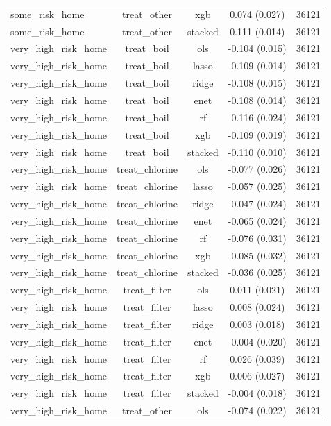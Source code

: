 \begin{table}[htbp]
\begin{tabular}{lcccc}
some_risk_home & treat_other & xgb & 0.074 (0.027) & 36121 \\
some_risk_home & treat_other & stacked & 0.111 (0.014) & 36121 \\
very_high_risk_home & treat_boil & ols & -0.104 (0.015) & 36121 \\
very_high_risk_home & treat_boil & lasso & -0.109 (0.014) & 36121 \\
very_high_risk_home & treat_boil & ridge & -0.108 (0.015) & 36121 \\
very_high_risk_home & treat_boil & enet & -0.108 (0.014) & 36121 \\
very_high_risk_home & treat_boil & rf & -0.116 (0.024) & 36121 \\
very_high_risk_home & treat_boil & xgb & -0.109 (0.019) & 36121 \\
very_high_risk_home & treat_boil & stacked & -0.110 (0.010) & 36121 \\
very_high_risk_home & treat_chlorine & ols & -0.077 (0.026) & 36121 \\
very_high_risk_home & treat_chlorine & lasso & -0.057 (0.025) & 36121 \\
very_high_risk_home & treat_chlorine & ridge & -0.047 (0.024) & 36121 \\
very_high_risk_home & treat_chlorine & enet & -0.065 (0.024) & 36121 \\
very_high_risk_home & treat_chlorine & rf & -0.076 (0.031) & 36121 \\
very_high_risk_home & treat_chlorine & xgb & -0.085 (0.032) & 36121 \\
very_high_risk_home & treat_chlorine & stacked & -0.036 (0.025) & 36121 \\
very_high_risk_home & treat_filter & ols & 0.011 (0.021) & 36121 \\
very_high_risk_home & treat_filter & lasso & 0.008 (0.024) & 36121 \\
very_high_risk_home & treat_filter & ridge & 0.003 (0.018) & 36121 \\
very_high_risk_home & treat_filter & enet & -0.004 (0.020) & 36121 \\
very_high_risk_home & treat_filter & rf & 0.026 (0.039) & 36121 \\
very_high_risk_home & treat_filter & xgb & 0.006 (0.027) & 36121 \\
very_high_risk_home & treat_filter & stacked & -0.004 (0.018) & 36121 \\
very_high_risk_home & treat_other & ols & -0.074 (0.022) & 36121 \\

\end{tabular}
\end{table}

